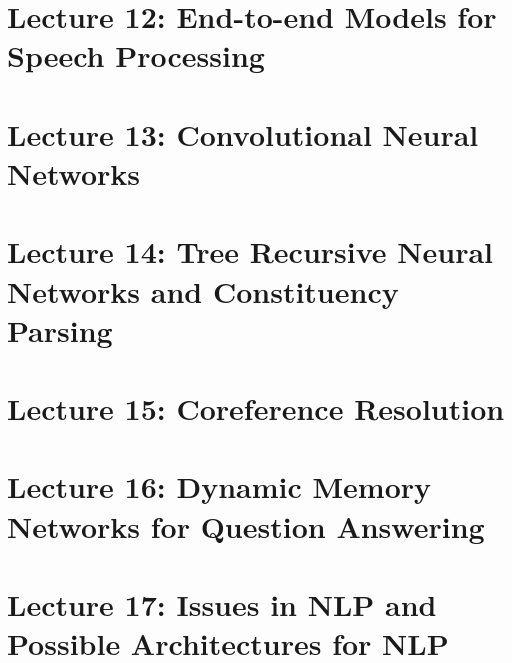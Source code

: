 \documentclass{article}
\begin{document}
\section{Lecture 12: End-to-end Models for Speech Processing}

\section{Lecture 13: Convolutional Neural Networks}

\section{Lecture 14: Tree Recursive Neural Networks and Constituency Parsing}

\section{Lecture 15: Coreference Resolution}

\section{Lecture 16: Dynamic Memory Networks for Question Answering}

\section{Lecture 17: Issues in NLP and Possible Architectures for NLP}

\end{document}

